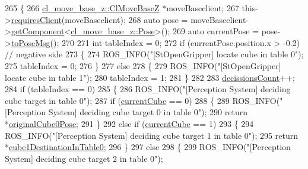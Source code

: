 \begin{DoxyCode}
265   \{
266     \hyperlink{classcl__move__base__z_1_1ClMoveBaseZ}{cl\_move\_base\_z::ClMoveBaseZ} *moveBaseclient;
267     this->\hyperlink{classsmacc_1_1ISmaccClient_a7a9990a2f3e35d547671188d69fee520}{requiresClient}(moveBaseclient);
268     \textcolor{keyword}{auto} pose = moveBaseclient->\hyperlink{classsmacc_1_1ISmaccClient_adef78db601749ca63c19e74a27cb88cc}{getComponent}<\hyperlink{classcl__move__base__z_1_1Pose}{cl\_move\_base\_z::Pose}>();
269     \textcolor{keyword}{auto} currentPose = pose->\hyperlink{classcl__move__base__z_1_1Pose_a9faf8c6b437ff6b19c8bddd692908dca}{toPoseMsg}();
270 
271     \textcolor{keywordtype}{int} tableIndex = 0;
272     \textcolor{keywordflow}{if} (currentPose.position.x > -0.2)  \textcolor{comment}{// negative side}
273     \{
274       ROS\_INFO(\textcolor{stringliteral}{"[StOpenGripper] locate cube in table 0"});
275       tableIndex = 0;
276     \}
277     \textcolor{keywordflow}{else}
278     \{
279       ROS\_INFO(\textcolor{stringliteral}{"[StOpenGripper] locate cube in table 1"});
280       tableIndex = 1;
281     \}
282 
283     \hyperlink{classsm__moveit__3_1_1cl__perception__system_1_1ClPerceptionSystem_a05c619f211e49dcfbcd3321c968ce1fc}{decissionsCount}++;
284     \textcolor{keywordflow}{if} (tableIndex == 0)
285     \{
286       ROS\_INFO(\textcolor{stringliteral}{"[Perception System] deciding cube target in table 0"});
287       \textcolor{keywordflow}{if} (\hyperlink{classsm__moveit__3_1_1cl__perception__system_1_1ClPerceptionSystem_ad915fc687481d4157ec40de52f8eaa82}{currentCube} == 0)
288       \{
289         ROS\_INFO(\textcolor{stringliteral}{"[Perception System] deciding cube target 0 in table 0"});
290         \textcolor{keywordflow}{return} *\hyperlink{classsm__moveit__3_1_1cl__perception__system_1_1ClPerceptionSystem_a296e8dd41bbb35a95d64e1780ab8be3d}{originalCube0Pose};
291       \}
292       \textcolor{keywordflow}{else} \textcolor{keywordflow}{if} (\hyperlink{classsm__moveit__3_1_1cl__perception__system_1_1ClPerceptionSystem_ad915fc687481d4157ec40de52f8eaa82}{currentCube} == 1)
293       \{
294         ROS\_INFO(\textcolor{stringliteral}{"[Perception System] deciding cube target 1 in table 0"});
295         \textcolor{keywordflow}{return} *\hyperlink{classsm__moveit__3_1_1cl__perception__system_1_1ClPerceptionSystem_aed05fa8526220f01330d5c2c2c014f71}{cube1DestinationInTable0};
296       \}
297       \textcolor{keywordflow}{else}
298       \{
299         ROS\_INFO(\textcolor{stringliteral}{"[Perception System] deciding cube target 2 in table 0"});

\end{DoxyCode}
